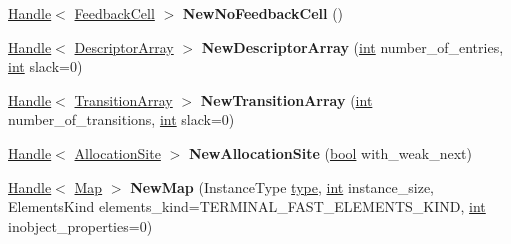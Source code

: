 \begin{DoxyCompactItemize}
\mbox{\label{classv8_1_1internal_1_1Factory_a459e228e1d54737b872f58c52cc5ce9a}} 
\mbox{\hyperlink{classv8_1_1internal_1_1Handle}{Handle}}$<$ \mbox{\hyperlink{classv8_1_1internal_1_1FeedbackCell}{Feedback\+Cell}} $>$ {\bfseries New\+No\+Feedback\+Cell} ()
\item 
\mbox{\label{classv8_1_1internal_1_1Factory_a5d2a0811cb6d00de67b64a9d93ebe3f8}} 
\mbox{\hyperlink{classv8_1_1internal_1_1Handle}{Handle}}$<$ \mbox{\hyperlink{classv8_1_1internal_1_1DescriptorArray}{Descriptor\+Array}} $>$ {\bfseries New\+Descriptor\+Array} (\mbox{\hyperlink{classint}{int}} number\+\_\+of\+\_\+entries, \mbox{\hyperlink{classint}{int}} slack=0)
\item 
\mbox{\label{classv8_1_1internal_1_1Factory_aa7be36c5aad08fc3c92455c3baa6b494}} 
\mbox{\hyperlink{classv8_1_1internal_1_1Handle}{Handle}}$<$ \mbox{\hyperlink{classv8_1_1internal_1_1TransitionArray}{Transition\+Array}} $>$ {\bfseries New\+Transition\+Array} (\mbox{\hyperlink{classint}{int}} number\+\_\+of\+\_\+transitions, \mbox{\hyperlink{classint}{int}} slack=0)
\item 
\mbox{\label{classv8_1_1internal_1_1Factory_a9246beda37bd9c6bc4c16aff8352813b}} 
\mbox{\hyperlink{classv8_1_1internal_1_1Handle}{Handle}}$<$ \mbox{\hyperlink{classv8_1_1internal_1_1AllocationSite}{Allocation\+Site}} $>$ {\bfseries New\+Allocation\+Site} (\mbox{\hyperlink{classbool}{bool}} with\+\_\+weak\+\_\+next)
\item 
\mbox{\label{classv8_1_1internal_1_1Factory_a0158b3454c0acb16b1f9f7443ce2e807}} 
\mbox{\hyperlink{classv8_1_1internal_1_1Handle}{Handle}}$<$ \mbox{\hyperlink{classv8_1_1internal_1_1Map}{Map}} $>$ {\bfseries New\+Map} (Instance\+Type \mbox{\hyperlink{classstd_1_1conditional_1_1type}{type}}, \mbox{\hyperlink{classint}{int}} instance\+\_\+size, Elements\+Kind elements\+\_\+kind=T\+E\+R\+M\+I\+N\+A\+L\+\_\+\+F\+A\+S\+T\+\_\+\+E\+L\+E\+M\+E\+N\+T\+S\+\_\+\+K\+I\+ND, \mbox{\hyperlink{classint}{int}} inobject\+\_\+properties=0)
\item 
\mbox{\label{classv8_1_1internal_1_1Factory_a841cc4ecab3c3588cba813b61e1be4ef}} 

\end{DoxyCompactItemize}
